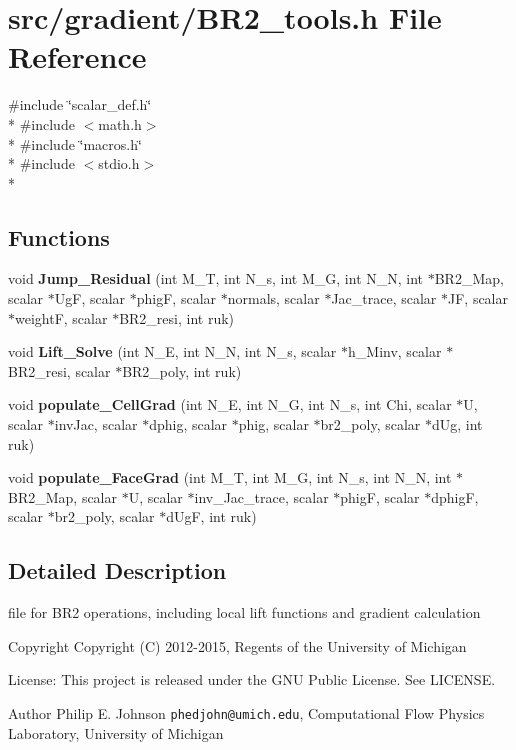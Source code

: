 \section{src/gradient/\-B\-R2\-\_\-tools.h File Reference}
\label{BR2__tools_8h}
{\ttfamily \#include \char`\"{}scalar\-\_\-def.\-h\char`\"{}}\\*
{\ttfamily \#include $<$math.\-h$>$}\\*
{\ttfamily \#include \char`\"{}macros.\-h\char`\"{}}\\*
{\ttfamily \#include $<$stdio.\-h$>$}\\*
\subsection*{Functions}
\begin{DoxyCompactItemize}
\item 
void {\bf Jump\-\_\-\-Residual} (int M\-\_\-\-T, int N\-\_\-s, int M\-\_\-\-G, int N\-\_\-\-N, int $\ast$B\-R2\-\_\-\-Map, scalar $\ast$Ug\-F, scalar $\ast$phig\-F, scalar $\ast$normals, scalar $\ast$Jac\-\_\-trace, scalar $\ast$J\-F, scalar $\ast$weight\-F, scalar $\ast$B\-R2\-\_\-resi, int ruk)
\item 
void {\bf Lift\-\_\-\-Solve} (int N\-\_\-\-E, int N\-\_\-\-N, int N\-\_\-s, scalar $\ast$h\-\_\-\-Minv, scalar $\ast$B\-R2\-\_\-resi, scalar $\ast$B\-R2\-\_\-poly, int ruk)
\item 
void {\bf populate\-\_\-\-Cell\-Grad} (int N\-\_\-\-E, int N\-\_\-\-G, int N\-\_\-s, int Chi, scalar $\ast$U, scalar $\ast$inv\-Jac, scalar $\ast$dphig, scalar $\ast$phig, scalar $\ast$br2\-\_\-poly, scalar $\ast$d\-Ug, int ruk)
\item 
void {\bf populate\-\_\-\-Face\-Grad} (int M\-\_\-\-T, int M\-\_\-\-G, int N\-\_\-s, int N\-\_\-\-N, int $\ast$B\-R2\-\_\-\-Map, scalar $\ast$U, scalar $\ast$inv\-\_\-\-Jac\-\_\-trace, scalar $\ast$phig\-F, scalar $\ast$dphig\-F, scalar $\ast$br2\-\_\-poly, scalar $\ast$d\-Ug\-F, int ruk)
\end{DoxyCompactItemize}


\subsection{Detailed Description}
file for B\-R2 operations, including local lift functions and gradient calculation \begin{DoxyCopyright}{Copyright}
Copyright (C) 2012-\/2015, Regents of the University of Michigan 
\end{DoxyCopyright}
\begin{DoxyParagraph}{License\-:}
This project is released under the G\-N\-U Public License. See L\-I\-C\-E\-N\-S\-E. 
\end{DoxyParagraph}
\begin{DoxyAuthor}{Author}
Philip E. Johnson {\tt phedjohn@umich.\-edu}, Computational Flow Physics Laboratory, University of Michigan 
\end{DoxyAuthor}


